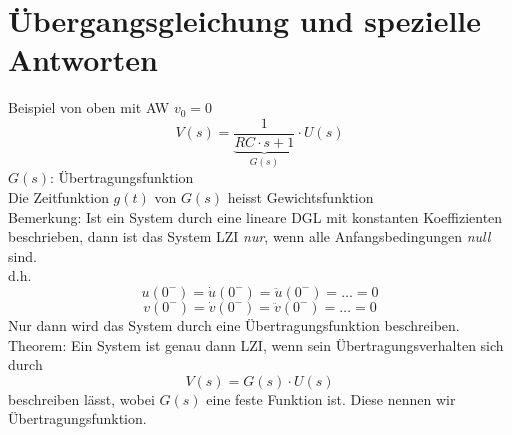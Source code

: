 \section{Übergangsgleichung und spezielle Antworten}
Beispiel von oben mit AW $v_0 = 0$
\[ V(s) = \underbrace{\frac{1}{RC \cdot s + 1}}_{G(s)} \cdot U(s) \]
$G(s)$: Übertragungsfunktion\\
Die Zeitfunktion $g(t)$ von $G(s)$ heisst Gewichtsfunktion\\
Bemerkung: Ist ein System durch eine lineare DGL mit konstanten Koeffizienten 
beschrieben, dann ist das System LZI \emph{nur}, wenn alle Anfangsbedingungen
\emph{null} sind. \\
d.h. 
\[ u(0^-) = \dot{u}(0^-) = \ddot{u}(0^-) = \ldots = 0 \]
\[ v(0^-) = \dot{v}(0^-) = \ddot{v}(0^-) = \ldots = 0 \]
Nur dann wird das System durch eine Übertragungsfunktion beschreiben. \\
Theorem: 
Ein System ist genau dann LZI, wenn sein Übertragungsverhalten sich durch 
\[ V(s) = G(s) \cdot U(s) \]
beschreiben lässt, wobei $G(s)$ eine feste Funktion ist. Diese nennen wir 
Übertragungsfunktion. 